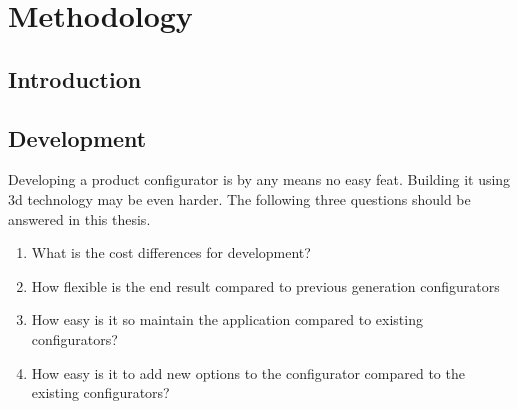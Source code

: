 

\chapter{Methodology}
\section{Introduction}

\section{Development}
Developing a product configurator is by any means no easy feat. Building it using 3d technology may be even harder. The following three questions should be answered in this thesis.
​\begin{enumerate}
\item What is the cost differences for development?

\item How flexible is the end result compared to previous generation configurators

\item How easy is it so maintain the application compared to existing configurators?

\item How easy is it to add new options to the configurator compared to the existing configurators?

\end{enumerate}

